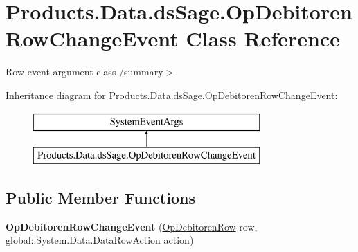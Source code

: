 \hypertarget{class_products_1_1_data_1_1ds_sage_1_1_op_debitoren_row_change_event}{}\section{Products.\+Data.\+ds\+Sage.\+Op\+Debitoren\+Row\+Change\+Event Class Reference}
\label{class_products_1_1_data_1_1ds_sage_1_1_op_debitoren_row_change_event}


Row event argument class /summary$>$  


Inheritance diagram for Products.\+Data.\+ds\+Sage.\+Op\+Debitoren\+Row\+Change\+Event\+:\begin{figure}[H]
\begin{center}
\leavevmode
\includegraphics[height=2.000000cm]{class_products_1_1_data_1_1ds_sage_1_1_op_debitoren_row_change_event}
\end{center}
\end{figure}
\subsection*{Public Member Functions}
\begin{DoxyCompactItemize}
\item 
{\bfseries Op\+Debitoren\+Row\+Change\+Event} (\hyperlink{class_products_1_1_data_1_1ds_sage_1_1_op_debitoren_row}{Op\+Debitoren\+Row} row, global\+::\+System.\+Data.\+Data\+Row\+Action action)\hypertarget{class_products_1_1_data_1_1ds_sage_1_1_op_debitoren_row_change_event_a4458ae121b73abd6b74b3d6a9e76774c}{}\label{class_products_1_1_data_1_1ds_sage_1_1_op_debitoren_row_change_event_a4458ae121b73abd6b74b3d6a9e76774c}

\end{DoxyCompactItemize}
